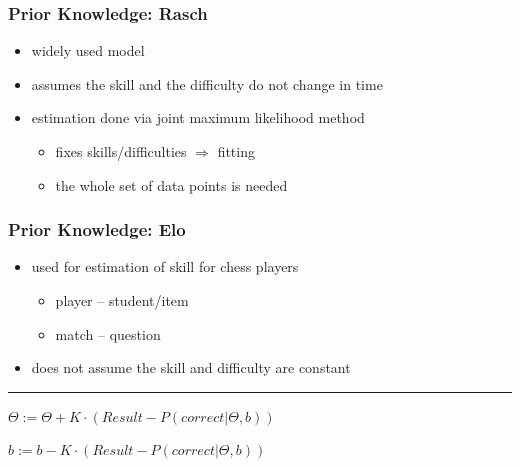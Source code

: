 \documentclass[xcolor=svgnames]{beamer}
\begin{document}
\begin{frame}
	\frametitle{Prior Knowledge: Rasch}
	\begin{itemize}
		\item widely used model
		\item assumes the skill and the difficulty do not change in time
		\item estimation done via \alert{joint maximum likelihood} method
			\begin{itemize}
				\item fixes skills/difficulties $\Rightarrow$ fitting
				\item the whole set of data points is needed
			\end{itemize}
	\end{itemize}
\end{frame}
\begin{frame}
	\frametitle{Prior Knowledge: Elo}
	\begin{itemize}
		\item used for estimation of skill for chess players
			\begin{itemize}
				\item player -- student/item
				\item match -- question
			\end{itemize}
		\item does not assume the skill and difficulty are constant
	\end{itemize}

	\bigskip

	\hrule

	\begin{center}
		$\Theta := \Theta + K \cdot \left(Result - P(correct|\Theta, b)\right)$

		\medskip

		$b := b - K \cdot \left(Result - P(correct|\Theta, b)\right)$
	\end{center}
\end{frame}
\end{document}
